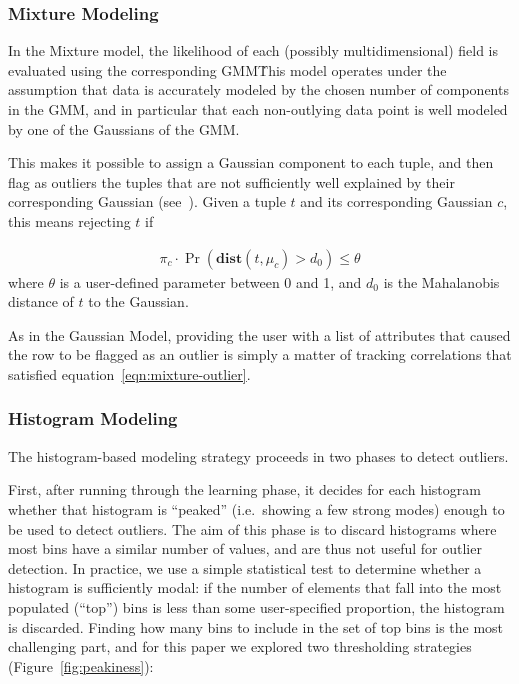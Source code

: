 \subsubsection{Mixture Modeling}
In the Mixture model, the likelihood of each (possibly multidimensional) field is evaluated using the corresponding GMM\. This model operates under the assumption that data is accurately modeled by the chosen number of components in the GMM, and in particular that each non-outlying data point is well modeled by one of the Gaussians of the GMM.

This makes it possible to assign a Gaussian component to each tuple, and then flag as outliers the tuples that are not sufficiently well explained by their corresponding Gaussian (see~\cite{Roberts1999}). Given a tuple $t$ and its corresponding Gaussian $c$, this means rejecting $t$ if

\begin{align}
  \pi_c \cdot \Pr(\textbf{dist}(t, \mu_c) > d_0)  \leq \theta
  \label{eqn:mixture-outlier}
\end{align}
where $\theta$ is a user-defined parameter between 0 and 1, and $d_0$ is the Mahalanobis distance of $t$ to the Gaussian.
 
As in the Gaussian Model, providing the user with a list of attributes that caused the row to be flagged as an outlier is simply a matter of tracking correlations that satisfied equation~\eqref{eqn:mixture-outlier}.

\subsubsection{Histogram Modeling}
\label{sec:outlier-detection-histograms}
The histogram-based modeling strategy proceeds in two phases to detect outliers.

First, after running through the learning phase, it decides for each histogram whether that histogram is ``peaked'' (i.e.\ showing a few strong modes) enough to be used to detect outliers. The aim of this phase is to discard histograms where most bins have a similar number of values, and are thus not useful for outlier detection. In practice, we use a simple statistical test to determine whether a histogram is sufficiently modal: if the number of elements that fall into the most populated (``top'') bins is less than some user-specified proportion, the histogram is discarded. Finding how many bins to include in the set of top bins is the most challenging part, and for this paper we explored two thresholding strategies (Figure~\ref{fig:peakiness}):

